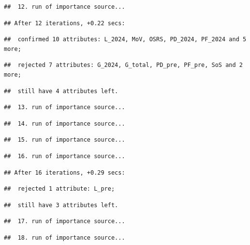 \documentclass[
]{article}
\begin{document}
\begin{verbatim}
##  12. run of importance source...
\end{verbatim}

\begin{verbatim}
## After 12 iterations, +0.22 secs:
\end{verbatim}

\begin{verbatim}
##  confirmed 10 attributes: L_2024, MoV, OSRS, PD_2024, PF_2024 and 5 more;
\end{verbatim}

\begin{verbatim}
##  rejected 7 attributes: G_2024, G_total, PD_pre, PF_pre, SoS and 2 more;
\end{verbatim}

\begin{verbatim}
##  still have 4 attributes left.
\end{verbatim}

\begin{verbatim}
##  13. run of importance source...
\end{verbatim}

\begin{verbatim}
##  14. run of importance source...
\end{verbatim}

\begin{verbatim}
##  15. run of importance source...
\end{verbatim}

\begin{verbatim}
##  16. run of importance source...
\end{verbatim}

\begin{verbatim}
## After 16 iterations, +0.29 secs:
\end{verbatim}

\begin{verbatim}
##  rejected 1 attribute: L_pre;
\end{verbatim}

\begin{verbatim}
##  still have 3 attributes left.
\end{verbatim}

\begin{verbatim}
##  17. run of importance source...
\end{verbatim}

\begin{verbatim}
##  18. run of importance source...
\end{verbatim}
\end{document}
